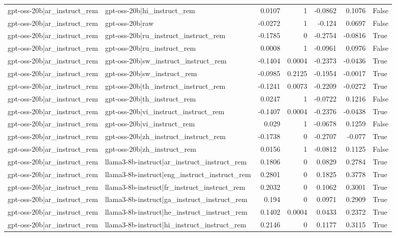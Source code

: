 \begin{table}
\begin{tabular}{l l r r r r l}
gpt-oss-20b|ar_instruct_rem & gpt-oss-20b|hi_instruct_rem & 0.0107 & 1 & -0.0862 & 0.1076 & False \\
gpt-oss-20b|ar_instruct_rem & gpt-oss-20b|raw & -0.0272 & 1 & -0.124 & 0.0697 & False \\
gpt-oss-20b|ar_instruct_rem & gpt-oss-20b|ru_instruct_instruct_rem & -0.1785 & 0 & -0.2754 & -0.0816 & True \\
gpt-oss-20b|ar_instruct_rem & gpt-oss-20b|ru_instruct_rem & 0.0008 & 1 & -0.0961 & 0.0976 & False \\
gpt-oss-20b|ar_instruct_rem & gpt-oss-20b|sw_instruct_instruct_rem & -0.1404 & 0.0004 & -0.2373 & -0.0436 & True \\
gpt-oss-20b|ar_instruct_rem & gpt-oss-20b|sw_instruct_rem & -0.0985 & 0.2125 & -0.1954 & -0.0017 & True \\
gpt-oss-20b|ar_instruct_rem & gpt-oss-20b|th_instruct_instruct_rem & -0.1241 & 0.0073 & -0.2209 & -0.0272 & True \\
gpt-oss-20b|ar_instruct_rem & gpt-oss-20b|th_instruct_rem & 0.0247 & 1 & -0.0722 & 0.1216 & False \\
gpt-oss-20b|ar_instruct_rem & gpt-oss-20b|vi_instruct_instruct_rem & -0.1407 & 0.0004 & -0.2376 & -0.0438 & True \\
gpt-oss-20b|ar_instruct_rem & gpt-oss-20b|vi_instruct_rem & 0.029 & 1 & -0.0678 & 0.1259 & False \\
gpt-oss-20b|ar_instruct_rem & gpt-oss-20b|zh_instruct_instruct_rem & -0.1738 & 0 & -0.2707 & -0.077 & True \\
gpt-oss-20b|ar_instruct_rem & gpt-oss-20b|zh_instruct_rem & 0.0156 & 1 & -0.0812 & 0.1125 & False \\
gpt-oss-20b|ar_instruct_rem & llama3-8b-instruct|ar_instruct_instruct_rem & 0.1806 & 0 & 0.0829 & 0.2784 & True \\
gpt-oss-20b|ar_instruct_rem & llama3-8b-instruct|eng_instruct_instruct_rem & 0.2801 & 0 & 0.1825 & 0.3778 & True \\
gpt-oss-20b|ar_instruct_rem & llama3-8b-instruct|fr_instruct_instruct_rem & 0.2032 & 0 & 0.1062 & 0.3001 & True \\
gpt-oss-20b|ar_instruct_rem & llama3-8b-instruct|ga_instruct_instruct_rem & 0.194 & 0 & 0.0971 & 0.2909 & True \\
gpt-oss-20b|ar_instruct_rem & llama3-8b-instruct|he_instruct_instruct_rem & 0.1402 & 0.0004 & 0.0433 & 0.2372 & True \\
gpt-oss-20b|ar_instruct_rem & llama3-8b-instruct|hi_instruct_instruct_rem & 0.2146 & 0 & 0.1177 & 0.3115 & True \\

\end{tabular}
\end{table}
